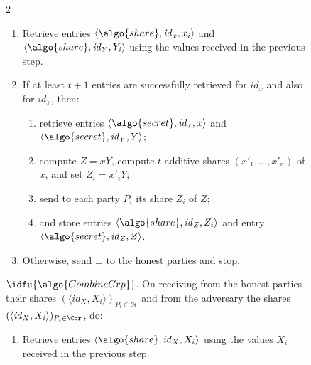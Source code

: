 \begin{figure}
\begin{minipage}{1.1\textwidth}
\begin{framed}
\begin{multicols}{2}
\begin{enumerate}
            \item Retrieve entries $\langle \algo{share}, \mathit{id}_x,
              x_i\rangle$ and $\langle \algo{share}, \mathit{id}_{{Y}}, {Y}_i
              \rangle$ using the values received in the previous step.

            \item If at least $t+1$ entries are successfully retrieved for
              $\mathit{id}_x$ and also for $\mathit{id}_{{Y}}$, then:

              \begin{enumerate}

                \item retrieve entries $\langle \algo{secret},
                  \mathit{id}_x,x\rangle$ and $\langle \algo{secret},
                  \mathit{id}_{{Y}},{Y}\rangle$;

                \item compute ${Z} = x{Y}$, compute $t$-additive shares $(x'_1,
                  ..., x'_n)$ of $x$, and set ${Z}_i = x'_i{Y}$;

                \item send to each party ${P}_i$ its share ${Z}_i$ of ${Z}$;

                \item and store entries $\langle \algo{share},
                  \mathit{id}_{{Z}}, {Z}_i\rangle$ and entry $\langle
                  \algo{secret}, \mathit{id}_{{Z}}, {Z}\rangle$.

              \end{enumerate}

            \item Otherwise, send $\bot$ to the honest parties and stop.

          \end{enumerate}

          {$\idfu{\algo{CombineGrp}}$.} On receiving from the honest parties
          their shares $(\langle \mathit{id}_{{X}}, {X}_i\rangle)_{{P}_i \in
          \mathcal{H}}$ and from the adversary the shares $(\langle
          \mathit{id}_{{X}}, {X}_i \rangle)_{{P}_i \in \Cor}$, do:

          \begin{enumerate}

            \item Retrieve entries $\langle \algo{share}, \mathit{id}_{{X}},
              {X}_i\rangle$ using the values ${X}_i$ received in the previous
              step.


\end{enumerate}
\end{multicols}
\end{framed}
\end{minipage}
\end{figure}
